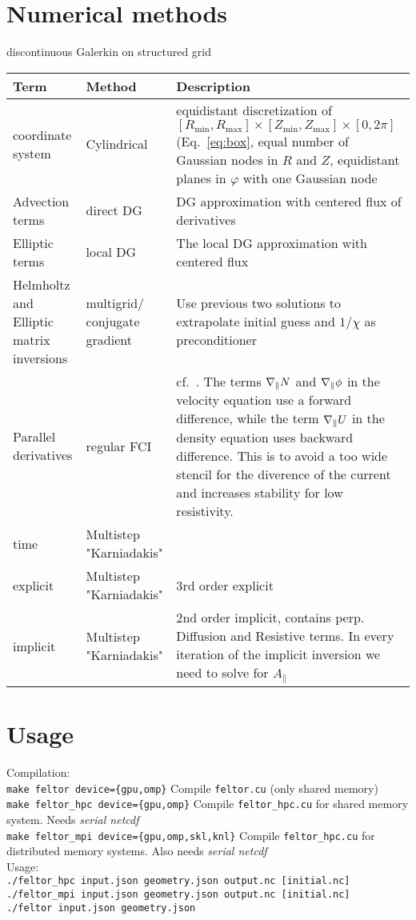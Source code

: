 \section{Numerical methods}
discontinuous Galerkin on structured grid
\begin{longtable}{p{3cm}p{3cm}p{8cm}}
\toprule
\rowcolor{gray!50}\textbf{Term} &  \textbf{Method} & \textbf{Description}  \\ \midrule
    coordinate system & Cylindrical & equidistant discretization of $[R_{\min},R_{\max}] \times [Z_{\min},Z_{\max}] \times [0,2\pi]$ (Eq.~\eqref{eq:box}, equal number of Gaussian nodes in $R$ and $Z$, equidistant planes in $\varphi$ with one Gaussian node \\
Advection terms & direct DG & DG approximation with centered flux of derivatives \\
Elliptic terms & local DG & The local DG approximation with centered flux \\
Helmholtz and Elliptic matrix inversions & multigrid/ conjugate gradient & Use previous two solutions to extrapolate initial guess and $1/\chi$ as preconditioner \\
Parallel derivatives & regular  FCI & cf.~\cite{Held2016,Stegmeir2017}. The terms $\nabla_\parallel N$ and $\nabla_\parallel \phi$ in the velocity equation use a forward difference, while the term $\nabla_\parallel U$ in the
density equation uses backward difference. This is to avoid a too wide stencil for the diverence of the current and increases stability for low resistivity. \\
time & Multistep "Karniadakis" & \\
\qquad explicit & Multistep "Karniadakis" & $3$rd order explicit\\
\qquad implicit & Multistep "Karniadakis" & $2$nd order implicit, contains perp. Diffusion and Resistive terms. In every iteration of the implicit inversion we need to solve for $A_\parallel$\\
\bottomrule
\end{longtable}

\section{Usage}

Compilation:\\
\texttt{make feltor device=\{gpu,omp\}} Compile \texttt{feltor.cu} (only shared memory)\\
\texttt{make feltor\_hpc device=\{gpu,omp\}} Compile \texttt{feltor\_hpc.cu} for shared memory system. Needs {\it serial netcdf} \\
\texttt{make feltor\_mpi device=\{gpu,omp,skl,knl\}} Compile \texttt{feltor\_hpc.cu} for distributed memory systems. Also needs {\it serial netcdf}\\
Usage:\\
\texttt{./feltor\_hpc input.json geometry.json output.nc [initial.nc]} \\
\texttt{./feltor\_mpi input.json geometry.json output.nc [initial.nc]} \\
\texttt{./feltor input.json geometry.json } \\

